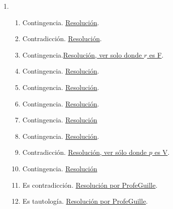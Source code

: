\documentclass[a4paper]{article}
\newcommand{\exercise}{\item}
\newcommand{\then}{\to}
\newcommand{\eq}{\leftrightarrow}
\begin{document}
\begin{enumerate}
\begin{enumerate} [label=(\alph*)]
		\item $( p  \land  q ) \then  ( r \lor  s )$ con $p$:"\textit{Vine en tren}", $q$:"\textit{Suspendieron el servicio}", $r$:"\textit{Tengo que volver en colectivo}" y $s$:"\textit{Tengo que volver caminando}".
		\item $( p  \land  q )  \land  r  \land  s $. $p$:"\textit{En un juego son importantes las mecánicas}", $q$:"\textit{En un juego es importantes la historia}", $r$:"\textit{Las mecánicas mantienen a la persona jugadora activa}" y $s$:"\textit{La historia la mantiene interesada}".
		\item $( q \then  p ) \eq  ( p \lor  \neg q)$ con $p$:"\textit{Los fantasmas se ponen azules}" y $q$:"\textit{El pacman come la fruta}".
\end{enumerate}\exercise\begin{enumerate} [label=(\alph*)]		\item Contingencia. \href{https://www.wolframalpha.com/input?i=%28not+p+or+q%29+and+not+q}{Resolución}.
		\item Contradicción. \href{https://www.wolframalpha.com/input?i=truth+table+of%3A+p+and+not+p}{Resolución}.
		\item Contingencia.\href{https://www.wolframalpha.com/input?i=p+and+r+or++q}{Resolución, ver solo donde $r$ es F}.
		\item Contingencia. \href{https://www.wolframalpha.com/input?i=p+and++q+or++r}{Resolución}.
		\item Contingencia. \href{https://www.wolframalpha.com/input?i=%28p+%3D%3E+q%29+%3D%3E+r}{Resolución}.
		\item Contingencia. \href{https://www.wolframalpha.com/input?i=p+%3C%3D%3E+%28q+xor++r%29}{Resolución}.
		\item Contingencia. \href{https://www.wolframalpha.com/input?i=p+or++%28not+q+xor++r%29}{Resolución}
		\item Contingencia. \href{https://www.wolframalpha.com/input?i=not+%28p+%3D%3E+%28q+and++r%29%29}{Resolución}.
		\item Contradicción. \href{https://www.wolframalpha.com/input?i=not+%28%28p+nor+q%29+%3D%3E+r%29}{Resolución, ver sólo donde $p$ es V}.
		\item Contingencia. \href{https://www.wolframalpha.com/input?i=%28p+nand+q%29+nor+r}{Resolución}
		\item Es contradicción. \href{https://youtu.be/n_t1f0xa3D0?t=413}{Resolución por ProfeGuille}.
		\item Es tautología. \href{https://youtu.be/n_t1f0xa3D0?t=643}{Resolución por ProfeGuille}.

\end{enumerate}
\end{enumerate}
\end{document}
